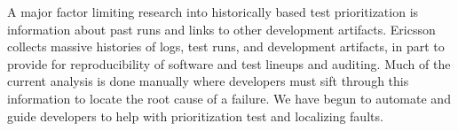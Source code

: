 A major factor limiting research into historically based test prioritization is
information about past runs and links to other development artifacts.  Ericsson
collects massive histories of logs, test runs, and development artifacts, in
part to provide for reproducibility of software and test lineups and auditing.
Much of the current analysis is done manually where developers must sift
through this information to locate the root cause of a failure. We have begun
to automate and guide developers to help with prioritization test and
localizing faults.



